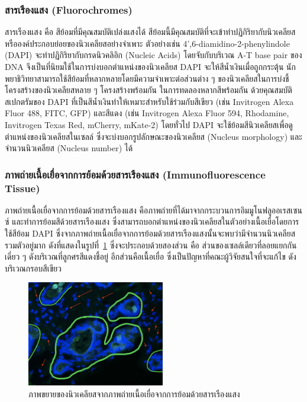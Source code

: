 \documentclass[12pt,oneside,openright,a4paper]{cpe-thai-project}
\begin{document}
\subsubsection{สารเรืองแสง (Fluorochromes)}
สารเรืองแสง คือ สีย้อมที่มีคุณสมบัติเปล่งแสงได้ สีย้อมนี้มีคุณสมบัติที่จะเข้าทำปฏิกิริยากับนิวเคลียสหรือองค์ประกอบย่อยของนิวเคลียสอย่างจำเพาะ ตัวอย่างเช่น 4',6-diamidino-2-phenylindole (DAPI) จะทำปฏิกิริยากับกรดนิวคลิอิก (Nucleic Acids) โดยจับกับบริเวณ A-T base pair ของ DNA จึงเป็นที่นิยมใช้ในการบ่งบอกตำแหน่งของนิวเคลียส DAPI จะให้สีน้ำเงินเมื่อถูกกระตุ้น นักพยาธิวิทยาสามารถใช้สีย้อมที่หลากหลายโดยมีความจำเพาะต่อส่วนต่าง ๆ ของนิวเคลียสในการบ่งชี้โครงสร้างของนิวเคลียสหลาย ๆ โครงสร้างพร้อมกัน ในการทดลองหลากสีพร้อมกัน ด้วยคุณสมบัติสเปกตรัมของ DAPI ที่เป็นสีน้ำเงินทําให้เหมาะสําหรับใช้ร่วมกับสีเขียว (เช่น Invitrogen Alexa Fluor 488, FITC, GFP) และสีแดง (เช่น Invitrogen Alexa Fluor 594, Rhodamine, Invitrogen Texas Red, mCherry, mKate-2) โดยทั่วไป DAPI จะใช้ย้อมสีนิวเคลียสเพื่อดูตำแหน่งของนิวเคลียสในเซลล์  ซึ่งจะบ่งบอกรูปลักษณะของนิวเคลียส (Nucleus morphology) และจำนวนนิวเคลียส (Nucleus number) ได้
\cite{13}
\subsubsection{ภาพถ่ายเนื้อเยื่อจากการย้อมด้วยสารเรืองแสง (Immunofluorescence Tissue)}
ภาพถ่ายเนื้อเยื่อจากการย้อมด้วยสารเรืองแสง คือภาพถ่ายที่ได้มาจากกระบวนการอิมมูโนฟลูออเรสเซนซ์ และทำการย้อมสีด้วยสารเรืองแสง ซึ่งสามารถบอกตําแหน่งของนิวเคลียสในตัวอย่างเนื้อเยื่อโดยการใช้สีย้อม DAPI ซึ่งจากภาพถ่ายเนื้อเยื่อจากการย้อมด้วยสารเรืองแสงนั้นจะพบว่ามีจำนวนนิวเคลียสรวมตัวอยู่มาก ดังที่แสดงในรูปที่~\ref{fig:Immunofluorescence tissue cell} \cite{14} ซึ่งจะประกอบด้วยสองส่วน คือ ส่วนของเซลล์เดียวที่ลอยแยกกันเดี่ยว ๆ ดังบริเวณที่ลูกศรสีแดงชี้อยู่ อีกส่วนคือเนื้อเยื่อ ซึ่งเป็นปัญหาที่คณะผู้วิจัยสนใจที่จะแก้ไข ดังบริเวณกรอบสีเขียว
\begin{figure}[!h]\centering
\includegraphics[width=6cm]{images/dataset_test.png}
\caption{ภาพขยายของนิวเคลียสจากภาพถ่ายเนื้อเยื่อจากการย้อมด้วยสารเรืองแสง}\label{fig:Immunofluorescence tissue cell}
\end{figure}
\end{document}
